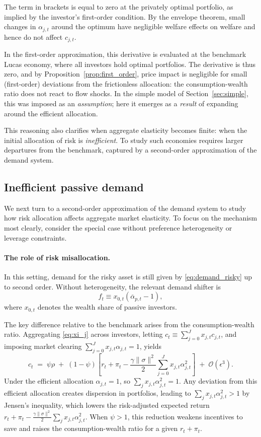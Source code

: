 \documentclass[12pt,english]{article}
\begin{document}
The term in brackets is equal to zero at the privately optimal portfolio, as implied by the investor’s first-order condition. By the envelope theorem, small changes in $\alpha_{j,t}$ around the optimum have negligible welfare effects on welfare and hence do not affect $c_{j,t}$.    

In the first-order approximation, this derivative is evaluated at the benchmark Lucas economy, where all investors hold optimal portfolios. The derivative is thus zero, and by Proposition~\ref{prop:first_order}, price impact is negligible for small (first-order) deviations from the frictionless allocation: the consumption-wealth ratio does not react to flow shocks. In the simple model of Section~\ref{sec:simple}, this was imposed as an \emph{assumption}; here it emerges as a \emph{result} of expanding around the efficient allocation.

This reasoning also clarifies when aggregate elasticity becomes finite: when the initial allocation of risk is \textit{inefficient}. To study such economies requires larger departures from the benchmark, captured by a second-order approximation of the demand system.

\subsection{Inefficient passive demand}

We next turn to a second-order approximation of the demand system to study how risk allocation affects aggregate market elasticity. To focus on the mechanism most clearly, consider the special case without preference heterogeneity or leverage constraints.  

\paragraph{The role of risk misallocation.}  
In this setting, demand for the risky asset is still given by \eqref{eq:demand_risky} up to second order. Without heterogeneity, the relevant demand shifter is  
\[
    f_t \equiv x_{0,t}\left(\overline{\alpha}_{p,t}-1\right),
\]
where $x_{0,t}$ denotes the wealth share of passive investors.  

The key difference relative to the benchmark arises from the consumption-wealth ratio. Aggregating \eqref{eq:xi_j} across investors, letting $c_t \equiv \sum_{j=0}^J x_{j,t} c_{j,t}$, and imposing market clearing $\sum_{j=0}^J x_{j,t}\alpha_{j,t}=1$, yields
\begin{equation}
    c_t
    \;=\;
    \psi\rho
    \;+\;
    (1-\psi)\!\left[
        r_t+\pi_t
        - \frac{\gamma\|\sigma\|^2}{2}\sum_{j=0}^J x_{j,t}\alpha_{j,t}^2
    \right]
    \;+\; \mathcal{O}(\epsilon^3).
\end{equation}
Under the efficient allocation $\alpha_{j,t}=1$, so $\sum_{j} x_{j,t}\alpha_{j,t}^2 = 1$. 
Any deviation from this efficient allocation creates dispersion in portfolios, leading to $\sum_j x_{j,t}\alpha_{j,t}^2>1$ by Jensen’s inequality, which lowers the risk-adjusted expected return $r_t+\pi_t - \tfrac{\gamma\|\sigma\|^2}{2}\sum_j x_{j,t}\alpha_{j,t}^2$. When $\psi>1$, this reduction weakens incentives to save and raises the consumption-wealth ratio for a given $r_t+\pi_t$.  
\end{document}
